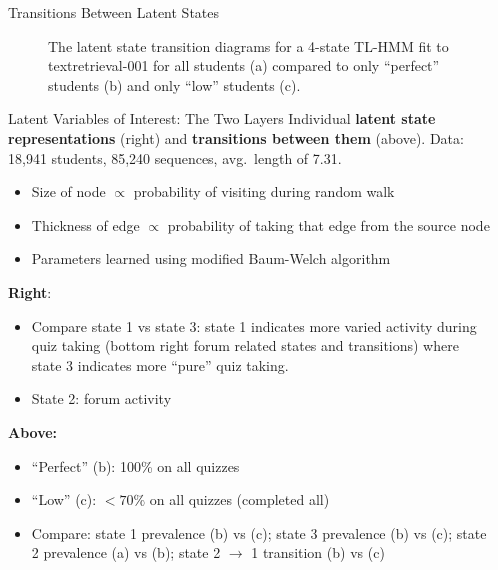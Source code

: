 \documentclass[final,t]{beamer}
\newcommand{\msp}[0]{\\[0.5\baselineskip]}
\newcommand{\vsp}[0]{\vspace{0.165in}}
\newcommand{\textretrieval}{textretrieval-001}
\begin{document}
\begin{frame}[fragile]
\begin{columns}[t]
\begin{column}{0.6\textwidth}
\begin{block}{Transitions Between Latent States}
\begin{figure}
\begin{subfigure}[t]{0.32\textwidth}
            \caption{\label{fig:trans-low}}
          \end{subfigure}
          \caption{The latent state transition diagrams for a 4-state TL-HMM fit to
            \protect\textretrieval{} for all students (a) compared to only ``perfect''
          students (b) and only ``low'' students (c).}
          \label{fig:trans-comp}
        \end{figure}
      \end{block}
      \vsp{}
      \begin{block}{Latent Variables of Interest: The Two Layers}
        Individual \textbf{latent state representations} (right) and
        \textbf{transitions between them} (above). Data: 18,941 students,
        85,240 sequences, avg.\ length of 7.31.
        \begin{itemize}
          \item Size of node $\propto$ probability of visiting during
            random walk
          \item Thickness of edge $\propto$ probability of taking that edge
            from the source node
          \item Parameters learned using modified Baum-Welch
            algorithm\msp{}
        \end{itemize}
        \textbf{Right}:
        \begin{itemize}
          \item Compare state 1 vs state 3: state 1 indicates more varied
            activity during quiz taking (bottom right forum related states
            and transitions) where state 3 indicates more ``pure'' quiz
            taking.
          \item State 2: forum activity\msp{}
        \end{itemize}
        \textbf{Above:}
        \begin{itemize}
          \item ``Perfect'' (b): 100\% on all quizzes
          \item ``Low'' (c): $< 70\%$ on all quizzes (completed all)
          \item Compare: state 1 prevalence (b) vs (c); state 3 prevalence
            (b) vs (c); state 2 prevalence (a) vs (b); state 2
            $\rightarrow$ 1 transition (b) vs (c)
        \end{itemize}
      \end{block}
    \end{column}
    \begin{column}{0.3\textwidth}

\end{column}
\end{columns}
\end{frame}
\end{document}
